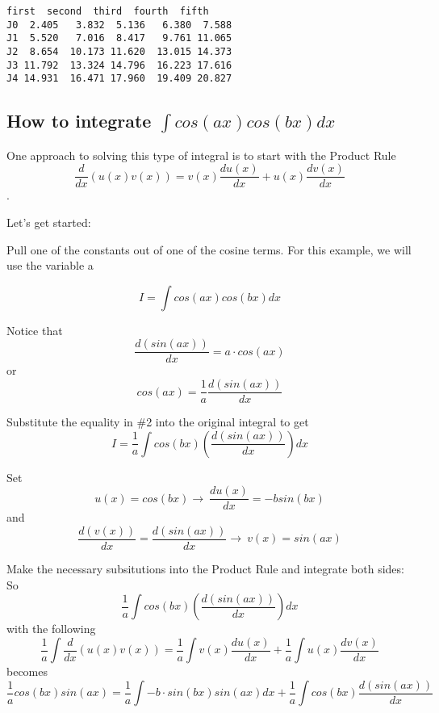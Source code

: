 \documentclass[11pt]{article}
\begin{document}
    \begin{Verbatim}[commandchars=\\\{\}]
    first  second  third  fourth  fifth
J0  2.405   3.832  5.136   6.380  7.588
J1  5.520   7.016  8.417   9.761 11.065
J2  8.654  10.173 11.620  13.015 14.373
J3 11.792  13.324 14.796  16.223 17.616
J4 14.931  16.471 17.960  19.409 20.827
    \end{Verbatim}

    \hypertarget{how-to-integrate-int-cosaxcosbx-dx}{%
\subsection{\texorpdfstring{How to integrate
\(\int cos(ax)cos(bx) dx\)}{How to integrate \textbackslash int cos(ax)cos(bx) dx}}\label{how-to-integrate-int-cosaxcosbx-dx}}

    One approach to solving this type of integral is to start with the
Product Rule
\[\frac {d}{dx} (u(x) v(x)) = v(x) \frac {du(x)}{dx} + u(x) \frac {dv(x)}{dx}\].

Let's get started:

Pull one of the constants out of one of the cosine terms. For this
example, we will use the variable a

\begin{equation}
I = \int cos(ax)cos(bx) dx
\end{equation}

Notice that \[\frac {d (sin(ax))}{dx} = a \cdot cos(ax)\] or
\begin{equation}
cos(ax) = \frac {1}{a} \frac {d(sin(ax))}{dx}
\label{eq:eq2} \tag{2}
\end{equation}

Substitute the equality in \#2 into the original integral to get
\[I = \frac{1}{a}\int cos(bx) (\frac {d(sin(ax))}{dx}){dx}\]

Set \[u(x) = cos(bx) \to\ \frac{d u(x)}{dx} = -b sin(bx)\] and
\[\frac {d (v(x))}{dx} = \frac {d (sin(ax))}{dx} \to\ v(x) = sin(ax)\]

Make the necessary subsitutions into the Product Rule and integrate both
sides: So \[\frac{1}{a}\int cos(bx) (\frac {d(sin(ax))}{dx}){dx}\] with
the following
\[\frac {1}{a} \int \frac {d}{dx} (u(x) v(x)) = \frac {1}{a} \int v(x) \frac {du(x)}{dx} + \frac {1}{a} \int u(x) \frac {dv(x)}{dx}\]
becomes \begin{equation}
\frac {1}{a} cos(bx) sin(ax) = \frac {1}{a} \int -b \cdot sin(bx) sin(ax) dx + \frac {1}{a} \int cos(bx) \frac {d(sin(ax))}{dx}
\label{eq:eq3} \tag{3}
\end{equation}
\end{document}
